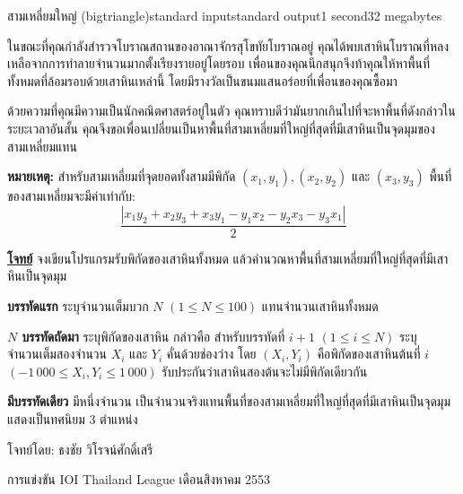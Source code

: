 \documentclass[11pt,a4paper]{article}
\begin{document}
\begin{problem}{สามเหลี่ยมใหญ่ (bigtriangle)}{standard input}{standard output}{1 second}{32 megabytes}

ในขณะที่คุณกำลังสำรวจโบราณสถานของอาณาจักรสุโขทัยโบราณอยู่ คุณได้พบเสาหินโบราณที่หลงเหลือจากการทำลายจำนวนมากตั้งเรียงรายอยู่โดยรอบ เพื่อนของคุณนึกสนุกจึงท้าคุณให้หาพื้นที่ทั้งหมดที่ล้อมรอบด้วยเสาหินเหล่านี้ โดยมีรางวัลเป็นขนมแสนอร่อยที่เพื่อนของคุณซื้อมา

ด้วยความที่คุณมีความเป็นนักคณิตศาสตร์อยู่ในตัว คุณทราบดีว่ามันยากเกินไปที่จะหาพื้นที่ดังกล่าวในระยะเวลาอันสั้น คุณจึงขอเพื่อนเปลี่ยนเป็นหาพื้นที่สามเหลี่ยมที่ใหญ่ที่สุดที่มีเสาหินเป็นจุดมุมของสามเหลี่ยมแทน

\textbf{หมายเหตุ:} สำหรับสามเหลี่ยมที่จุดยอดทั้งสามมีพิกัด $(x_1, y_1), (x_2, y_2)$ และ $(x_3, y_3)$  พื้นที่ของสามเหลี่ยมจะมีค่าเท่ากับ: $$\frac{|x_1y_2 + x_2y_3 + x_3y_1 - y_1x_2 - y_2x_3 - y_3x_1|}{2}$$

\underline{\textbf{โจทย์}} จงเขียนโปรแกรมรับพิกัดของเสาหินทั้งหมด แล้วคำนวณหาพื้นที่สามเหลี่ยมที่ใหญ่ที่สุดที่มีเสาหินเป็นจุดมุม

\InputFile

\textbf{บรรทัดแรก} ระบุจำนวนเต็มบวก $N$ $(1 \leq N \leq 100)$ แทนจำนวนเสาหินทั้งหมด

\textbf{$N$ บรรทัดถัดมา} ระบุพิกัดของเสาหิน กล่าวคือ สำหรับบรรทัดที่ $i+1$ $(1 \leq i \leq N)$ ระบุจำนวนเต็มสองจำนวน $X_i$ และ $Y_i$ คั่นด้วยช่องว่าง โดย $(X_i, Y_i)$ คือพิกัดของเสาหินต้นที่ $i$ $(-1\,000 \leq X_i,Y_i \leq 1\,000)$ รับประกันว่าเสาหินสองต้นจะไม่มีพิกัดเดียวกัน

\OutputFile

\textbf{มีบรรทัดเดียว} มีหนึ่งจำนวน เป็นจำนวนจริงแทนพื้นที่ของสามเหลี่ยมที่ใหญ่ที่สุดที่มีเสาหินเป็นจุดมุม แสดงเป็นทศนิยม $3$ ตำแหน่ง

\Examples

\begin{example}
%
%
\end{example}

\Source

โจทย์โดย: ธงชัย วิโรจน์ศักดิ์เสรี

การแข่งขัน IOI Thailand League เดือนสิงหาคม 2553

\end{problem}
\end{document}
